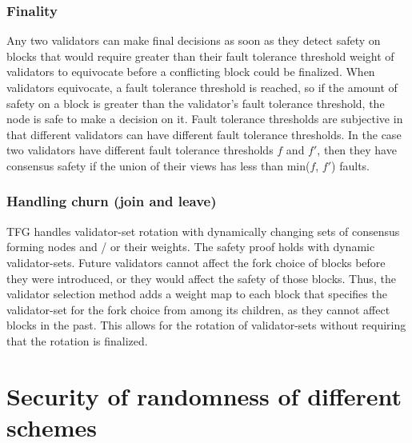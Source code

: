 \documentclass[10pt,journal,compsoc]{IEEEtran}
\begin{document}
\subsubsection{Finality}
Any two validators can make final decisions as soon as they detect safety on blocks that would require greater than their fault tolerance threshold weight of validators to equivocate before a conflicting block could be finalized. When validators equivocate, a fault tolerance threshold is reached, so if the amount of safety on a block is greater than the validator’s fault tolerance threshold, the node is safe to make a decision on it. Fault tolerance thresholds are subjective in that different validators can have different fault tolerance thresholds. In the case two validators have different fault tolerance thresholds $f$ and $f'$, then they have consensus safety if the union of their views has less than min($f$, $f'$) faults. 

\subsubsection{Handling churn (join and leave)}
TFG handles validator-set rotation with dynamically changing sets of consensus forming nodes and / or their weights. The safety proof holds with dynamic validator-sets. Future validators cannot affect the fork choice of blocks before they were introduced, or they would affect the safety of those blocks. Thus, the validator selection method adds a weight map to each block that specifies the validator-set for the fork choice from among its children, as they cannot affect blocks in the past. This allows for the rotation of validator-sets without requiring that the rotation is finalized. 

\section{Security of randomness of different schemes}
\end{document}
